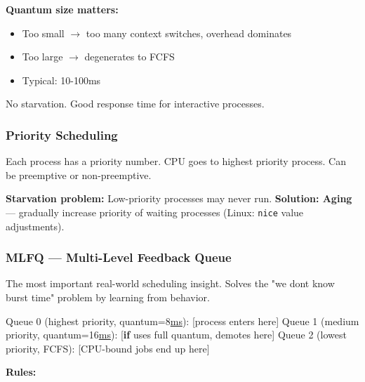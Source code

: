 \documentclass[11pt]{article}
\providecommand{\tightlist}{\setlength{\itemsep}{1pt}\setlength{\parskip}{0pt}}
\newenvironment{Shaded}{\begin{snugshade}}{\end{snugshade}}
\newcommand{\ControlFlowTok}[1]{\textcolor[rgb]{0.99,0.74,0.29}{\textbf{#1}}}
\newcommand{\DecValTok}[1]{\textcolor[rgb]{0.96,0.45,0.00}{#1}}
\newcommand{\ErrorTok}[1]{\textcolor[rgb]{0.85,0.27,0.33}{\underline{#1}}}
\newcommand{\NormalTok}[1]{\textcolor[rgb]{0.81,0.81,0.76}{#1}}
\newcommand{\OperatorTok}[1]{\textcolor[rgb]{0.81,0.81,0.76}{#1}}
\begin{document}
\textbf{Quantum size matters:}

\begin{itemize}
\tightlist
\item
  Too small \(\rightarrow\) too many context switches, overhead dominates
\item
  Too large \(\rightarrow\) degenerates to FCFS
\item
  Typical: 10-100ms
\end{itemize}

No starvation. Good response time for interactive processes.

\subsubsection{Priority Scheduling}\label{priority-scheduling}

Each process has a priority number. CPU goes to highest priority process. Can be preemptive or non-preemptive.

\textbf{Starvation problem:} Low-priority processes may never run.
\textbf{Solution: Aging} --- gradually increase priority of waiting processes (Linux: \texttt{nice} value adjustments).

\subsubsection{MLFQ --- Multi-Level Feedback Queue}\label{mlfq--multi-level-feedback-queue}

The most important real-world scheduling insight. Solves the "we don\textquotesingle t know burst time" problem by learning from behavior.


\begin{Shaded}
\begin{Highlighting}[]
\NormalTok{Queue }\DecValTok{0}\NormalTok{ (highest priority, quantum}\OperatorTok{=}\DecValTok{8}\ErrorTok{ms}\NormalTok{):    [process enters here]}
\NormalTok{Queue }\DecValTok{1}\NormalTok{ (medium priority, quantum}\OperatorTok{=}\DecValTok{16}\ErrorTok{ms}\NormalTok{):    [}\ControlFlowTok{if}\NormalTok{ uses full quantum, demotes here]}
\NormalTok{Queue }\DecValTok{2}\NormalTok{ (lowest priority, FCFS):            [CPU}\OperatorTok{{-}}\NormalTok{bound jobs end up here]}
\end{Highlighting}
\end{Shaded}

\textbf{Rules:}
\end{document}
